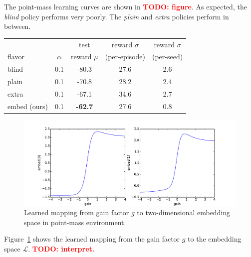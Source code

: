\documentclass{article}
\newcommand{\TODO}[1]{\textcolor{red}{\textbf{TODO: #1}}}
\newcommand{\cL}{\mathcal{L}}
\begin{document}
The point-mass learning curves are shown in \TODO{figure}.
As expected, the \emph{blind} policy performs very poorly.
The \emph{plain} and \emph{extra} policies perform in between.


\begin{table}
\centering
\begin{tabular}{l c c c c}
       &          & test         & reward $\sigma$          & reward $\sigma$       \\
flavor & $\alpha$ & reward $\mu$ &            (per-episode) &            (per-seed) \\
\hline
blind & 0.1 & -80.3 & 27.6 & 2.6 \\
plain & 0.1 & -70.8 & 28.2 & 2.4 \\
extra & 0.1 & -67.1 & 34.6 & 2.7 \\
embed (ours) & 0.1 & \textbf{-62.7} & 27.6 & 0.8 \\
\end{tabular}
\end{table}

\begin{figure}
\centering
\includegraphics[width=\textwidth]{pointmass_embed_mapping.pdf}
\caption{
Learned mapping from gain factor $g$ to two-dimensional embedding space in point-mass environment.
}
\label{fig:embed-mapping}
\end{figure}
Figure~\ref{fig:embed-mapping} shows the learned mapping from the gain factor $g$
to the embedding space $\cL$.
\TODO{interpret.}
\end{document}

